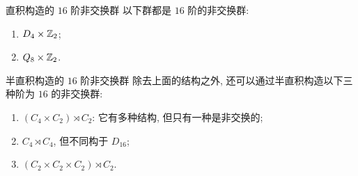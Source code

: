             \begin{ins}
                {直积构造的 \(16\) 阶非交换群}
                以下群都是 \(16\) 阶的非交换群:
                \begin{enumerate}
                    \item \(D_4\times\operatorname{\mathbb{Z}}_2\);
                    \item \(Q_8\times\operatorname{\mathbb{Z}}_2\).
                \end{enumerate}
            \end{ins}

            \begin{ins}
                {半直积构造的 \(16\) 阶非交换群}
                除去上面的结构之外, 还可以通过半直积构造以下三种阶为 \(16\) 的非交换群:
                \begin{enumerate}
                    \item \((C_4 \times C_2) \rtimes C_2\): 它有多种结构, 但只有一种是非交换的;
                    \item \(C_4 \rtimes C_4\), 但不同构于 \(D_{16}\);
                    \item \((C_2 \times C_2 \times C_2) \rtimes C_2\).
                \end{enumerate}
            \end{ins}

